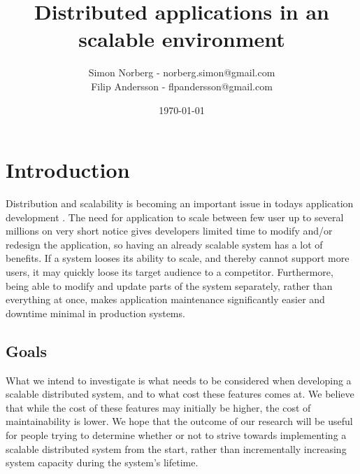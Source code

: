 \documentclass{article}
\begin{document}
 
\title{Distributed applications in an scalable environment}
\author{Simon Norberg - norberg.simon@gmail.com\\
        Filip Andersson - flpandersson@gmail.com }
\date{\today}
\maketitle
 
 
\section{Introduction}
Distribution and scalability is becoming an important issue in todays
application development \cite{rellermeyer2007services}.
The need for application to scale between few user up
to several millions on very short notice gives developers limited time to
modify and/or redesign the application, so having an already scalable system
has a lot of benefits. If a system looses its ability to scale, and thereby
cannot support more users, it may quickly loose its target audience to a
competitor. Furthermore, being able to modify and update parts of the system
separately, rather than everything at once, makes application maintenance
significantly easier and downtime minimal in production systems.
 
\subsection{Goals} 
What we intend to investigate is what needs to be considered when developing a
scalable distributed system, and to what cost these features comes at. We
believe that while the cost of these features may initially be higher, the cost
of maintainability is lower. We hope that the outcome of our research will be
useful for people trying to determine whether or not to strive towards
implementing a scalable distributed system from the start, rather than
incrementally increasing system capacity during the system's lifetime.

\newpage
\end{document}
